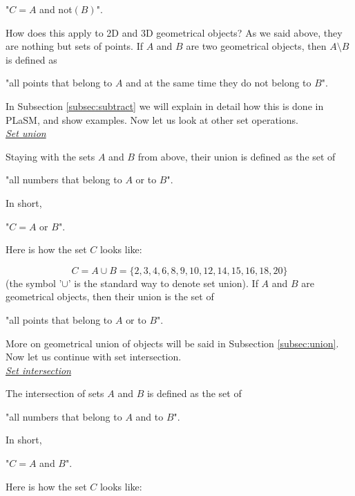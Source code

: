 \centerline{
"$C = A$ {\color{red}and} {\color{red}not}$(B)$".
}
\vspace{4mm}
\noindent
How does this apply to 2D and 3D geometrical objects? As we said above,
they are nothing but sets of points. If $A$ and $B$ are two geometrical objects,
then $A \setminus B$ is defined as\\

\centerline{
"all points that belong to $A$ {\color{red}and} at the same time they do {\color{red}not} belong to $B$".
}
\vspace{4mm}
\noindent
In Subsection \ref{subsec:subtract} we will explain in detail how this is done 
in PLaSM, and show examples. Now let us look at other set operations.\\

\noindent
\underline{\em Set union}

Staying with the sets $A$ and $B$ from above, their union is defined 
as the set of \\

\centerline{
"all numbers that belong to $A$ {\color{red}or} to $B$".
}
\vspace{4mm}
\noindent
In short,\\

\centerline{
"$C = A$ {\color{red}or} $B$".
}
\vspace{4mm}
\noindent
Here is how the set $C$ looks like:

$$
C = A \cup B = \{2, 3, 4, 6, 8, 9, 10, 12, 14, 15, 16, 18, 20\}
$$
(the symbol '$\cup$' is the standard way to denote set union). If $A$
and $B$ are geometrical objects, then their union is the set of \\

\centerline{
"all points that belong to $A$ {\color{red}or} to $B$".
}
\vspace{4mm}
\noindent
More on geometrical union of objects will be said in 
Subsection \ref{subsec:union}. Now let us continue with 
set intersection.\\

\noindent
\underline{\em Set intersection}

The intersection of sets $A$ and $B$ is defined as the set of \\

\centerline{
"all numbers that belong to $A$ {\color{red}and} to $B$".
}
\vspace{4mm}
\noindent
In short,\\

\centerline{
"$C = A$ {\color{red}and} $B$".
}
\vspace{4mm}
\noindent
Here is how the set $C$ looks like:

